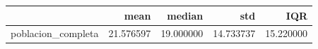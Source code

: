 \begin{tabular}{lrrrr}
\toprule
 & mean & median & std & IQR \\
\midrule
poblacion_completa & 21.576597 & 19.000000 & 14.733737 & 15.220000 \\
\bottomrule
\end{tabular}

